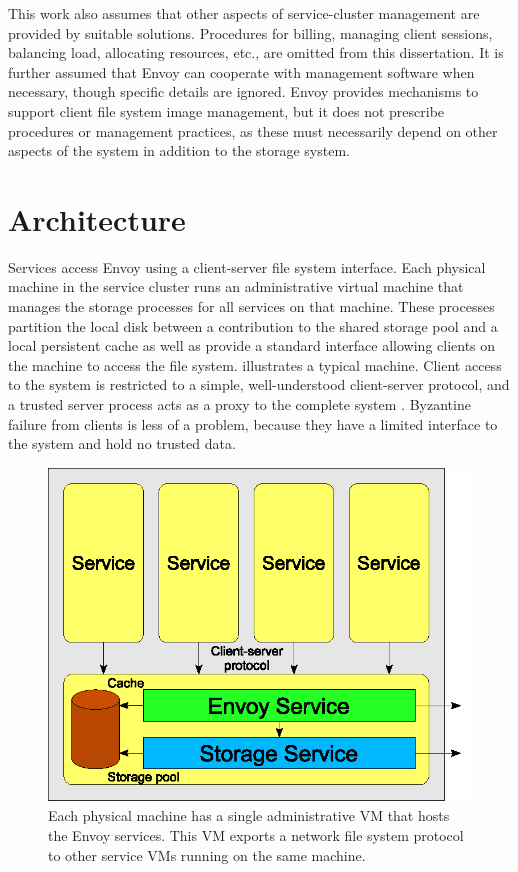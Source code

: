 This work also assumes that other aspects of service-cluster management are provided by suitable solutions. Procedures for billing, managing client sessions, balancing load, allocating resources, etc., are omitted from this dissertation. It is further assumed that Envoy can cooperate with management software when necessary, though specific details are ignored. Envoy provides mechanisms to support client file system image management, but it does not prescribe procedures or management practices, as these must necessarily depend on other aspects of the system in addition to the storage system.

\section{Architecture}

Services access Envoy using a client-server file system interface. Each physical machine in the service cluster runs an administrative virtual machine that manages the storage processes for all services on that machine. These processes partition the local disk between a contribution to the shared storage pool and a local persistent cache as well as provide a standard interface allowing clients on the machine to access the file system.  illustrates a typical machine. Client access to the system is restricted to a simple, well-understood client-server protocol, and a trusted server process acts as a proxy to the complete system \cite{shapiro}. Byzantine failure from clients is less of a problem, because they have a limited interface to the system and hold no trusted data.

\begin{figure}[t]
\centering
\includegraphics[width=\figwidth]{figures/single-machine}
\caption[Layout of Envoy services in a single machine]{Each physical machine has a single administrative VM that hosts the Envoy services. This VM exports a network file system protocol to other service VMs running on the same machine.}
\label{fig:single-machine}
\end{figure}

